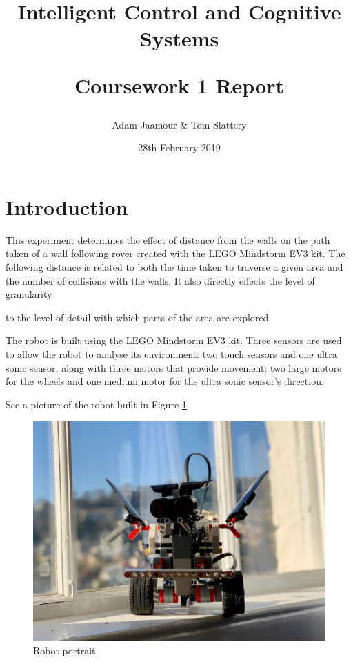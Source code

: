 \documentclass[a4paper,12pt,twocolumn]{article}
\title{
    Intelligent Control and Cognitive Systems\\
    \begin{large}
        Coursework 1 Report
    \end{large}
}
\author{Adam Jaamour & Tom Slattery}
\date{28th February 2019}
\begin{document}
\maketitle
\thispagestyle{empty}
\clearpage
\setcounter{page}{1}


\section{Introduction}

This experiment determines the effect of distance from the walls on the path taken of a wall following rover created with the LEGO Mindstorm EV3 kit. The following distance is related to both the time taken to traverse a given area and the number of collisions with the walls. It also directly effects the level of granularity 

to the level of detail with which parts of the area are explored.  





The robot is built using the LEGO Mindstorm EV3 kit. Three sensors are used to allow the robot to analyse its environment: two touch sensors and one ultra sonic sensor, along with three motors that provide movement: two large motors for the wheels and one medium motor for the ultra sonic sensor's direction.

See a picture of the robot built in Figure \ref{fig:robot-portrait}

\begin{figure}[ht]
\centering
\includegraphics[width=\linewidth]{figures/robot_portrait.jpeg}
\caption{Robot portrait}
  \label{fig:robot-portrait}
\end{figure}
\end{document}
